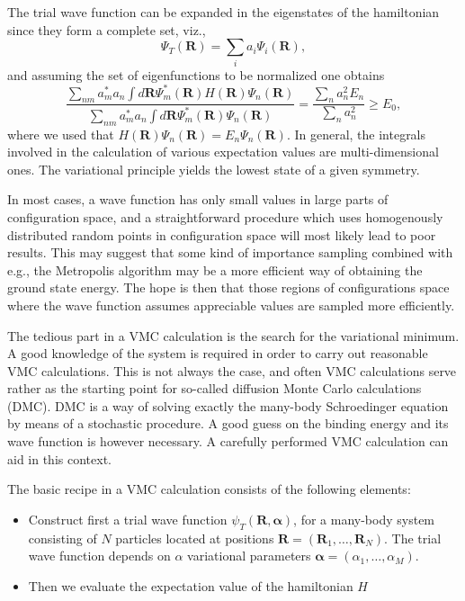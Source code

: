 \documentclass[%
oneside,                 %
final,                   %
10pt]{article}
\begin{document}
The trial wave function can be expanded in the eigenstates of the hamiltonian since they form a complete set, viz.,
\[
   \Psi_T(\bm{R})=\sum_i a_i\Psi_i(\bm{R}),
\]
and assuming the set of eigenfunctions to be normalized one obtains 
\[
     \frac{\sum_{nm}a^*_ma_n \int d\bm{R}\Psi^{\ast}_m(\bm{R})H(\bm{R})\Psi_n(\bm{R})}
        {\sum_{nm}a^*_ma_n \int d\bm{R}\Psi^{\ast}_m(\bm{R})\Psi_n(\bm{R})} =\frac{\sum_{n}a^2_n E_n}
        {\sum_{n}a^2_n} \ge E_0,
\]
where we used that $H(\bm{R})\Psi_n(\bm{R})=E_n\Psi_n(\bm{R})$.
In general, the integrals involved in the calculation of various  expectation
values  are multi-dimensional ones. 
The variational principle yields the lowest state of a given symmetry.

In most cases, a wave function has only small values in large parts of 
configuration space, and a straightforward procedure which uses
homogenously distributed random points in configuration space 
will most likely lead to poor results. This may suggest that some kind
of importance sampling combined with e.g., the Metropolis algorithm 
may be  a more efficient way of obtaining the ground state energy.
The hope is then that those regions of configurations space where
the wave function assumes appreciable values are sampled more 
efficiently. 

The tedious part in a VMC calculation is the search for the variational
minimum. A good knowledge of the system is required in order to carry out
reasonable VMC calculations. This is not always the case, 
and often VMC calculations 
serve rather as the starting
point for so-called diffusion Monte Carlo calculations (DMC). DMC is a way of
solving exactly the many-body Schroedinger equation by means of 
a stochastic procedure. A good guess on the binding energy
and its wave function is however necessary. 
A carefully performed VMC calculation can aid in this context. 

The basic recipe in a VMC calculation consists of the following elements:

\begin{itemize}
\item Construct first a trial wave function $\psi_T(\bm{R},\bm{\alpha})$,  for a many-body system consisting of $N$ particles located at positions  $\bm{R}=(\bm{R}_1,\dots ,\bm{R}_N)$. The trial wave function depends on $\alpha$ variational parameters $\bm{\alpha}=(\alpha_1,\dots ,\alpha_M)$.

\item Then we evaluate the expectation value of the hamiltonian $H$ 
\end{itemize}
\end{document}

